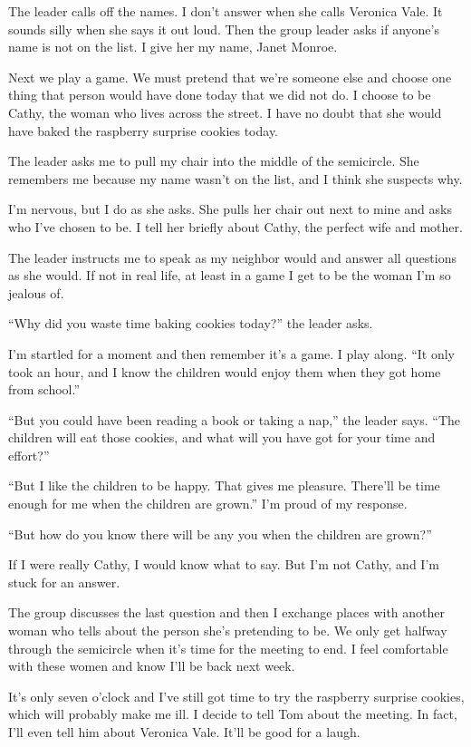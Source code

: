 \documentclass[twoside,10pt]{book}
\begin{document}
The leader calls off the names. I don't answer when she calls Veronica
Vale. It sounds silly when she says it out loud. Then the group leader
asks if anyone's name is not on the list. I give her my name, Janet
Monroe.

Next we play a game. We must pretend that we're someone else and choose
one thing that person would have done today that we did not do. I choose
to be Cathy, the woman who lives across the street. I have no doubt that
she would have baked the raspberry surprise cookies today.

The leader asks me to pull my chair into the middle of the semicircle.
She remembers me because my name wasn't on the list, and I think she
suspects why.

I'm nervous, but I do as she asks. She pulls her chair out next to mine
and asks who I've chosen to be. I tell her briefly about Cathy, the
perfect wife and mother.

The leader instructs me to speak as my neighbor would and answer all
questions as she would. If not in real life, at least in a game I get to
be the woman I'm so jealous of.

``Why did you waste time baking cookies today?'' the leader asks.

I'm startled for a moment and then remember it's a game. I play along.
``It only took an hour, and I know the children would enjoy them when
they got home from school.''

``But you could have been reading a book or taking a nap,'' the leader
says. ``The children will eat those cookies, and what will you have got
for your time and effort?''

``But I like the children to be happy. That gives me pleasure. There'll
be time enough for me when the children are grown.'' I'm proud of my
response.

``But how do you know there will be any you when the children are
grown?''

If I were really Cathy, I would know what to say. But I'm not Cathy, and
I'm stuck for an answer.

The group discusses the last question and then I exchange places with
another woman who tells about the person she's pretending to be. We only
get halfway through the semicircle when it's time for the meeting to
end. I feel comfortable with these women and know I'll be back next
week.

It's only seven o'clock and I've still got time to try the raspberry
surprise cookies, which will probably make me ill. I decide to tell Tom
about the meeting. In fact, I'll even tell him about Veronica Vale.
It'll be good for a laugh.
\end{document}
